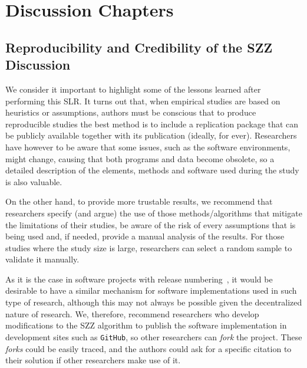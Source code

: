 \documentclass[a4paper, 12pt]{book}
\begin{document}
\section{Discussion Chapters}
\subsection{Reproducibility and Credibility of the SZZ Discussion}
\label{subsec:implicationsSZZ}

We consider it important to highlight some of the lessons learned after performing this SLR. It turns out that, when empirical studies are based on heuristics or assumptions, authors must be conscious that to produce reproducible studies the best method is to include a replication package that can be publicly available together with its publication (ideally, for ever). Researchers have however to be aware that some issues, such as the software environments, might change, causing that both programs and data become obsolete, so a detailed description of the elements, methods and software used during the study is also valuable.

On the other hand, to provide more trustable results, we recommend that researchers specify (and argue) the use of those methods/algorithms that mitigate the limitations of their studies, be aware of the risk of every assumptions that is being used and, if needed, provide a manual analysis of the results. For those studies where the study size is large, researchers can select a random sample to validate it manually.

As it is the case in software projects with release numbering~\cite{israeli2010linux}, it would be desirable to have a similar mechanism for software implementations used in such type of research, although this may not always be possible given the decentralized nature of research. We, therefore, recommend researchers who develop modifications to the SZZ algorithm to publish the software implementation in development sites such as \texttt{GitHub}, so other researchers can \emph{fork} the project. These \emph{forks} could be easily traced, and the authors could ask for a specific citation to their solution if other researchers make use of it.
\end{document}
